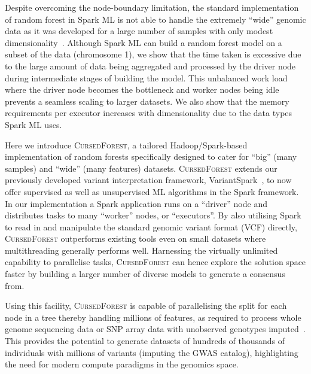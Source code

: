 \documentclass[10pt,letterpaper]{article}
\newcommand{\cursedforest}{\textsc{CursedForest}\xspace}
\begin{document}
Despite overcoming the node-boundary limitation, the standard implementation of random forest in Spark ML
is not able to handle the extremely ``wide'' genomic data as it was developed for a large number of samples
with only modest dimensionality~\cite{NIPS2016_6366}.  Although Spark ML can build a random forest model on a subset of the data (chromosome
1), we show that the time taken is excessive due to the large amount of data being aggregated and processed by the driver node during
intermediate stages of building the model.  This unbalanced work load where the driver
node becomes the bottleneck and worker nodes being idle prevents a seamless scaling to larger datasets. We also show that the memory
requirements per executor increases with dimensionality due to the data types Spark ML uses.%
  
Here we introduce \cursedforest, a tailored Hadoop/Spark-based implementation of random forests specifically designed to cater
for ``big'' (many samples) and ``wide'' (many features) datasets. 
\cursedforest extends our previously developed variant interpretation framework, VariantSpark~\cite{OBrien2015}, to now offer
supervised as well as unsupervised ML algorithms in the Spark framework.
In our implementation a Spark application runs on a ``driver'' node and
distributes tasks to many ``worker'' nodes, or ``executors''. 
By also utilising Spark to read in and manipulate the standard genomic variant format (VCF)
directly, \cursedforest outperforms existing tools even on small datasets where multithreading generally performs
well. Harnessing the virtually unlimited capability to parallelise tasks, \cursedforest can hence explore the solution 
space faster by building a larger number of diverse models to generate a consensus from. 

Using this facility, \cursedforest is capable of parallelising the split for each node in a tree thereby handling millions 
of features, as required to process whole genome sequencing data or SNP array data with unobserved genotypes 
imputed~\cite{Howie2012}.  This provides the potential to generate datasets of hundreds of thousands of individuals 
with millions of variants (imputing the GWAS catalog), highlighting the need for modern
compute paradigms in the genomics space.
\end{document}
